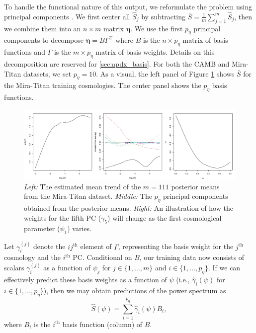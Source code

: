 \documentclass[11pt]{article}
\begin{document}
To handle the functional nature of this output, we reformulate the problem using principal
components \citep[PCs, e.g.][]{banerjee2014linear}.  
We first center all $\hat{S}_j$ by subtracting $\bar{S} = \frac{1}{m}\sum_{j=1}^{m} \hat{S}_j$, 
then we combine them into an $n\times m$ matrix $\boldsymbol\eta$.  We use the first $p_\eta$ 
principal components to decompose $\boldsymbol\eta = B\Gamma^\top$ where $B$ is the 
$n\times p_\eta$ matrix of basis functions and $\Gamma$ is the $m\times p_\eta$ matrix of basis weights.  
Details on this decomposition are reserved for \ref{sec:apdx_basis}. For both the CAMB and Mira-Titan 
datasets, we set $p_\eta=10$. As a visual, the left panel of Figure \ref{fig:mean_PCs_oneW} shows 
$\bar{S}$ for the Mira-Titan training cosmologies.  The center panel shows the $p_\eta$ basis functions.

\begin{figure}
    \centering
    \includegraphics[width=\textwidth]{mean_PCs_oneW.jpeg}
    \caption{{\it Left:} The estimated mean trend of the $m=111$ posterior means from 
    the Mira-Titan dataset. {\it Middle:} The $p_\eta$ principal components obtained from 
    the posterior means. {\it Right:} An 
    illustration of how the weights for the fifth PC ($\gamma_5$) will change as the first 
    cosmological parameter ($\psi_1$) varies.}
    \label{fig:mean_PCs_oneW}
\end{figure}

 
Let $\gamma_i^{(j)}$ denote the $ij^\textrm{th}$ element of $\Gamma$, representing the basis weight for the 
$j^\textrm{th}$ cosmology and the $i^\textrm{th}$ PC.
Conditional on $B$, our training data now consists of scalars $\gamma_i^{(j)}$ as a function of $\psi_j$
for $j \in \{1,\ldots,m\}$ and $i \in \{1,\ldots,p_\eta\}$.  If we can effectively predict these basis weights
as a function of $\psi$ (i.e., $\hat{\gamma}_i(\psi)$ for $i \in \{1,\ldots,p_\eta\}$), then we may obtain predictions 
of the power spectrum as
\[
\hat{S}(\psi) = \sum_{i=1}^{p_\eta} \hat{\gamma}_i(\psi) B_i,
\]
where $B_i$ is the $i^\textrm{th}$ basis function (column) of $B$.
\end{document}

